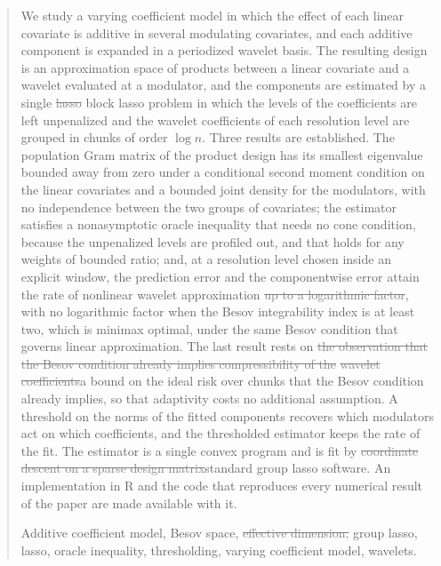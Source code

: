 \documentclass[12pt]{article} %
\theoremstyle{definition}
\theoremstyle{plain}
\begin{document}
\begin{quotation}
We study a varying coefficient model in which the effect of each linear
covariate is additive in several modulating covariates, and each additive
component is expanded in a periodized wavelet basis. The resulting design is
\textcolor{colR1}{an approximation space} of products between a linear covariate and a wavelet evaluated at a
modulator, and the components are estimated by a single \textcolor{gray}{\sout{lasso}}
\textcolor{colR1}{block lasso} problem in
which the levels of the coefficients are left unpenalized \textcolor{colR1}{and the
wavelet coefficients of each resolution level are grouped in chunks of order
$\log n$}. Three results are
established. The population Gram matrix of the product design has its
smallest eigenvalue bounded away from zero under a conditional second moment
condition on the linear covariates and a bounded joint density for the
modulators, with no independence between the two groups of covariates; the
estimator satisfies a nonasymptotic oracle inequality that needs no cone
condition, because the unpenalized levels are profiled out\textcolor{colR1}{, and
that holds for any weights of bounded ratio}; and, at a
resolution level chosen inside an explicit window, the prediction error and
the componentwise error attain the rate of nonlinear wavelet approximation\textcolor{gray}{\sout{ up
to a logarithmic factor}}\textcolor{colR1}{, with no logarithmic factor when the Besov
integrability index is at least two}\textcolor{colR1}{, which is minimax optimal}, under the same Besov condition that governs
\textcolor{colR1}{linear approximation}. The last result rests on \textcolor{gray}{\sout{the observation that the Besov
condition already implies compressibility of the}} \textcolor{gray}{\sout{wavelet}} \textcolor{gray}{\sout{coefficients}}\textcolor{colR1}{a
bound on the ideal risk over chunks that the Besov condition already implies},
so that adaptivity costs no additional assumption. \textcolor{colR1}{A threshold on the
norms of the fitted components recovers which modulators act on which
coefficients, and the thresholded estimator keeps the rate of the fit.} The
estimator is a single convex
program and is fit by \textcolor{gray}{\sout{coordinate descent on a sparse design matrix}}\textcolor{colR1}{standard
group lasso software}.
\textcolor{colR1}{An implementation in R and the code that reproduces every
numerical result of the paper are made available with it.}

\vspace{9pt}
Additive coefficient model, Besov space, \textcolor{gray}{\sout{effective dimension,}} \textcolor{colR1}{group
lasso,} lasso, oracle
inequality, \textcolor{colR1}{thresholding,} varying coefficient model, wavelets.
\par
\end{quotation}\par
\end{document}
